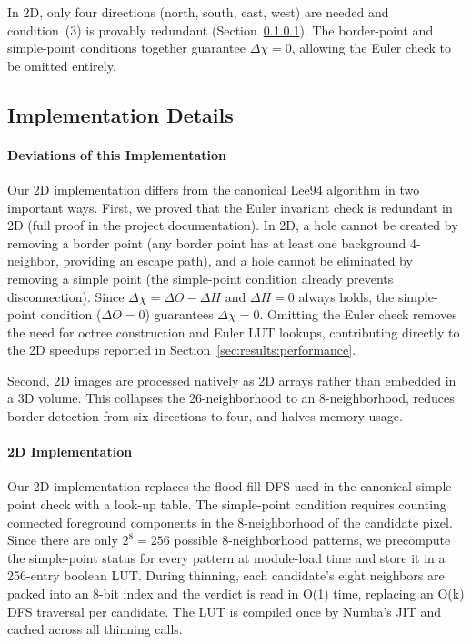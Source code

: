 \documentclass[11pt]{article}
\begin{document}
In 2D, only four directions (north, south, east, west) are needed and
condition~(3) is provably redundant (Section~\ref{sec:methods:impl:deviations}).
The border-point and simple-point conditions together guarantee
$\Delta\chi = 0$, allowing the Euler check to be omitted entirely.

\subsection{Implementation Details}\label{sec:methods:impl}

\paragraph{Deviations of this Implementation}\label{sec:methods:impl:deviations}

Our 2D implementation differs from the canonical Lee94 algorithm in
two important ways. First, we proved that the Euler invariant check
is redundant in 2D (full proof in the project documentation). In 2D,
a hole cannot be created by removing a border point (any border point
has at least one background 4-neighbor, providing an escape path), and
a hole cannot be eliminated by removing a simple point (the
simple-point condition already prevents disconnection). Since
$\Delta\chi = \Delta O - \Delta H$ and $\Delta H = 0$ always holds,
the simple-point condition ($\Delta O = 0$) guarantees $\Delta\chi =
0$. Omitting the Euler check removes the need for octree construction
and Euler LUT lookups, contributing directly to the 2D speedups
reported in Section~\ref{sec:results:performance}.

Second, 2D images are processed natively as 2D arrays rather than
embedded in a 3D volume. This collapses the 26-neighborhood to an
8-neighborhood, reduces border detection from six directions to four,
and halves memory usage.

\paragraph{2D Implementation}\label{sec:methods:impl:2d}

Our 2D implementation replaces the flood-fill DFS used in the
canonical simple-point check with a look-up table. The simple-point
condition requires counting connected foreground components in the
8-neighborhood of the candidate pixel. Since there are only $2^8 =
256$ possible 8-neighborhood patterns, we precompute the simple-point
status for every pattern at module-load time and store it in a
256-entry boolean LUT. During thinning, each candidate's eight
neighbors are packed into an 8-bit index and the verdict is read in
O(1) time, replacing an O(k) DFS traversal per candidate. The LUT is
compiled once by Numba's JIT and cached across all thinning calls.
\end{document}
